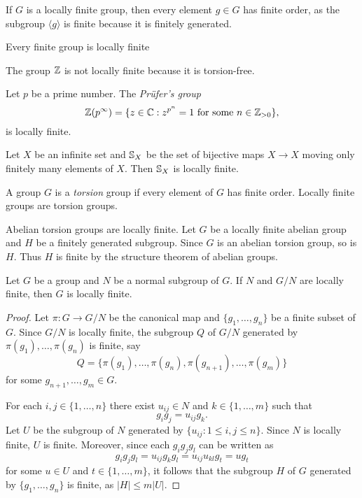 If $G$ is a locally finite group, then every element $g\in G$ has finite order, as
the subgroup $\langle g\rangle$ is finite because it is finitely generated.

\begin{example}
    Every finite group is locally finite
\end{example}

\begin{example}
    The group $\mathbb{Z}$ is not locally finite because it is torsion-free.
\end{example}

\begin{example}
	Let $p$ be a prime number. 
	The \emph{Pr\"ufer's group}  
	\[
		\mathbb{Z}(p^{\infty})=\{z\in\mathbb{C}:z^{p^n}=1\text{ for some $n\in\mathbb{Z}_{>0}$}\}, 
	\]
	is locally finite. 
\end{example}

\begin{example}
	Let $X$ be an infinite set and $\mathbb{S}_X$ be the set of bijective maps $X\to
	X$ moving only finitely many elements of $X$. Then 
	$\mathbb{S}_X$ is locally finite.
\end{example}

A group $G$ is a \emph{torsion} group if every element of $G$
has finite order. Locally finite groups are torsion groups. 

\begin{example}
    Abelian torsion groups are locally finite. Let $G$ be a locally finite abelian group 
    and $H$ be a finitely generated subgroup. Since $G$ is an abelian torsion group, so is $H$. Thus
    $H$ is finite by the structure theorem of abelian groups. 
\end{example}

\begin{proposition}
\label{pro:exact_LI}
	Let $G$ be a group and $N$ be a normal subgroup of $G$. If $N$ and $G/N$
	are locally finite, then $G$ is locally finite.
\end{proposition}

\begin{proof}
	Let $\pi\colon G\to G/N$ be the canonical map and $\{g_1,\dots,g_n\}$ be a finite subset of $G$. 
	Since $G/N$ is locally finite, the subgroup $Q$ of $G/N$ generated by 
	$\pi(g_1),\dots,\pi(g_n)$ is finite, say
	\[
		Q=\{\pi(g_1),\dots,\pi(g_n),\pi(g_{n+1}),\dots,\pi(g_m)\}
	\]
	for some $g_{n+1},\dots,g_m\in G$. 
	
	For each $i,j\in\{1,\dots,n\}$ there exist $u_{ij}\in N$ and 
	$k\in\{1,\dots,m\}$ such that \[
	g_ig_j=u_{ij}g_k.
	\]
	Let $U$ be the subgroup of $N$
	generated by $\{u_{ij}:1\leq i,j\leq n\}$. Since $N$ is locally finite, $U$ is finite. Moreover, since 
	each $g_ig_jg_l$ can be written as 
	\[
		g_ig_jg_l=u_{ij}g_kg_l=u_{ij}u_{kl}g_t=ug_t
	\]
	for some $u\in U$ and $t\in\{1,\dots,m\}$, it follows that the subgroup 
	$H$ of $G$ generated by $\{g_1,\dots,g_n\}$ is finite, as 
	$|H|\leq m|U|$. 
\end{proof}

